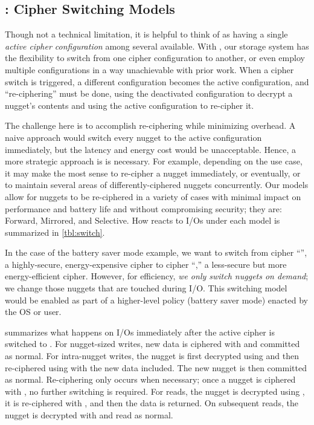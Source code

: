 \subsection{\sysA: Cipher Switching Models}\label{subsec:des-switch}

Though not a technical limitation, it is helpful to think of \sys as having a
single {\em active cipher configuration} among several available. With \sysA,
our storage system has the flexibility to switch from one cipher configuration
to another, or even employ multiple configurations in a way unachievable with
prior work. When a cipher switch is triggered, a different configuration becomes
the active configuration, and ``re-ciphering'' must be done, \ie using the
deactivated configuration to decrypt a nugget's contents and using the active
configuration to re-cipher it.

The challenge here is to accomplish re-ciphering while minimizing overhead. A
naive approach would switch every nugget to the active configuration
immediately, but the latency and energy cost would be unacceptable. Hence, a
more strategic approach is is necessary. For example, depending on the use case,
it may make the most sense to re-cipher a nugget immediately, or eventually, or
to maintain several areas of differently-ciphered nuggets concurrently. Our
models allow for nuggets to be re-ciphered in a variety of cases with minimal
impact on performance and battery life and without compromising security; they
are: Forward, Mirrored, and Selective. How \sys reacts to I/Os under each model
is summarized in \cref{tbl:switch}.




 In the case of the battery saver mode
example, we want to switch from cipher ``\cone'', a highly-secure,
energy-expensive cipher to cipher ``\ctwo,'' a less-secure but more
energy-efficient cipher. However, for efficiency, {\em we only switch
nuggets on demand}; \ie we change those nuggets that are touched
during I/O. This switching model would be enabled as part of a
higher-level policy (\ie battery saver mode) enacted by the OS or
user.

 summarizes what happens on I/Os immediately after the
active cipher is switched to \ctwo. For nugget-sized writes, new data is
ciphered with \ctwo and committed as normal. For intra-nugget writes, the nugget
is first decrypted using \cone and then re-ciphered using \ctwo with the new
data included. The new nugget is then committed as normal. Re-ciphering only
occurs when necessary; once a nugget is ciphered with \ctwo, no further
switching is required. For reads, the nugget is decrypted using \cone, it is
re-ciphered with \ctwo, and then the data is returned. On subsequent reads, the
nugget is decrypted with \ctwo and read as normal.

